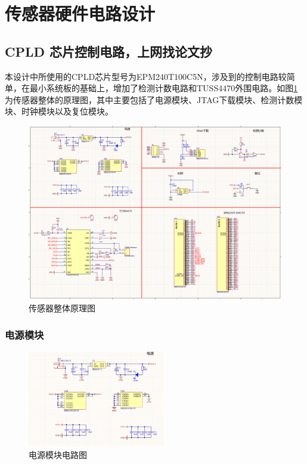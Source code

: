     \newpage
	\section{传感器硬件电路设计}
	
    \subsection{CPLD 芯片控制电路，上网找论文抄}
    本设计中所使用的CPLD芯片型号为EPM240T100C5N，涉及到的控制电路较简单，在最小系统板的基础上，增加了检测计数电路和TUSS4470外围电路。如图\ref{传感器整体原理图}为传感器整体的原理图，其中主要包括了电源模块、JTAG下载模块、检测计数模块、时钟模块以及复位模块。
    \begin{figure}[H]
        \centering
        \includegraphics[width=12cm]{figure/Overall circuit.png}
        \caption{传感器整体原理图}
        \label{传感器整体原理图}
    \end{figure}
    \subsubsection{电源模块}
    \songti{}
         \begin{figure}[H]
        \centering
        \includegraphics[width=6cm]{figure/Power circuit.png}
        \songti{}\caption{电源模块电路图}
        \label{电源模块电路图}
    \end{figure}
    
